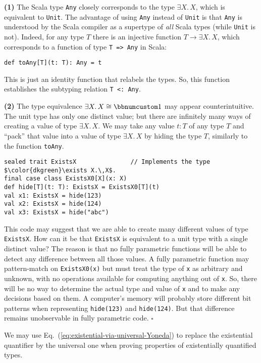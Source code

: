 \textbf{(1)} The Scala type \lstinline!Any! closely corresponds to
the type $\exists X.\,X$, which is equivalent to \lstinline!Unit!.
The advantage of using \lstinline!Any! instead of \lstinline!Unit!
is that \lstinline!Any! is understood by the Scala compiler as a
supertype of \emph{all} Scala types (while \lstinline!Unit! is not).
Indeed, for any type $T$ there is an injective function $T\rightarrow\exists X.\,X$,
which corresponds to a function of type \lstinline!T => Any! in Scala:
\begin{lstlisting}
def toAny[T](t: T): Any = t
\end{lstlisting}
 This is just an identity function that relabels the types. So, this
function establishes the subtyping relation \lstinline!T <: Any!. 

\textbf{(2)} The type equivalence $\exists X.\,X\cong\bbnum 1$ may
appear counterintuitive. The unit type has only one distinct value;
but there are infinitely many ways of creating a value of type $\exists X.\,X$.
We may take any value $t:T$ of any type $T$ and \textsf{``}pack\textsf{''} that
value into a value of type $\exists X.\,X$ by hiding the type $T$,
similarly to the function \lstinline!toAny!.
\begin{lstlisting}[mathescape=true]
sealed trait ExistsX               // Implements the type $\color{dkgreen}\exists X.\,X$.
final case class ExistsX0[X](x: X)
def hide[T](t: T): ExistsX = ExistsX0[T](t)
val x1: ExistsX = hide(123)
val x2: ExistsX = hide(124)
val x3: ExistsX = hide("abc")
\end{lstlisting}
This code may suggest that we are able to create many different values
of type \lstinline!ExistsX!. How can it be that \lstinline!ExistsX!
is equivalent to a unit type with a single distinct value? The reason
is that no fully parametric functions will be able to detect any difference
between all those values. A fully parametric function may pattern-match
on \lstinline!ExistsX0(x)! but must treat the type of \lstinline!x!
as arbitrary and unknown, with no operations available for computing
anything out of \lstinline!x!. So, there will be no way to determine
the actual type and value of \lstinline!x! and to make any decisions
based on them. A computer\textsf{'}s memory will probably store different bit
patterns when representing \lstinline!hide(123)! and \lstinline!hide(124)!.
But that difference remains unobservable in fully parametric code.
$\square$

We may use Eq.~(\ref{eq:existential-via-universal-Yoneda}) to replace
the existential quantifier by the universal one when proving properties
of existentially quantified types.

